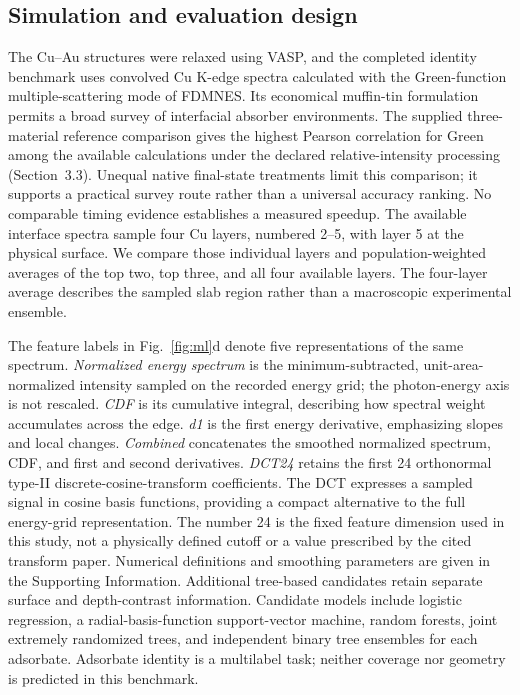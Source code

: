 \documentclass[11pt,a4paper]{article}
\newcommand{\ca}{Cu--Au}
\begin{document}
\subsection{Simulation and evaluation design}
The \ca{} structures were relaxed using VASP, and the completed identity benchmark uses convolved Cu K-edge spectra calculated with the Green-function multiple-scattering mode of FDMNES.\cite{vasp1996,joly2001} Its economical muffin-tin formulation permits a broad survey of interfacial absorber environments.\cite{fdmnesmanual} The supplied three-material reference comparison gives the highest Pearson correlation for Green among the available calculations under the declared relative-intensity processing (Section~3.3). Unequal native final-state treatments limit this comparison; it supports a practical survey route rather than a universal accuracy ranking. No comparable timing evidence establishes a measured speedup. The available interface spectra sample four Cu layers, numbered 2--5, with layer 5 at the physical surface. We compare those individual layers and population-weighted averages of the top two, top three, and all four available layers. The four-layer average describes the sampled slab region rather than a macroscopic experimental ensemble.

The feature labels in Fig.~\ref{fig:ml}d denote five representations of the same spectrum. \textit{Normalized energy spectrum} is the minimum-subtracted, unit-area-normalized intensity sampled on the recorded energy grid; the photon-energy axis is not rescaled. \textit{CDF} is its cumulative integral, describing how spectral weight accumulates across the edge. \textit{d1} is the first energy derivative, emphasizing slopes and local changes. \textit{Combined} concatenates the smoothed normalized spectrum, CDF, and first and second derivatives. \textit{DCT24} retains the first 24 orthonormal type-II discrete-cosine-transform coefficients. The DCT expresses a sampled signal in cosine basis functions,\cite{ahmed1974} providing a compact alternative to the full energy-grid representation. The number 24 is the fixed feature dimension used in this study, not a physically defined cutoff or a value prescribed by the cited transform paper. Numerical definitions and smoothing parameters are given in the Supporting Information. Additional tree-based candidates retain separate surface and depth-contrast information. Candidate models include logistic regression, a radial-basis-function support-vector machine, random forests, joint extremely randomized trees, and independent binary tree ensembles for each adsorbate.\cite{geurts2006} Adsorbate identity is a multilabel task; neither coverage nor geometry is predicted in this benchmark.
\end{document}
